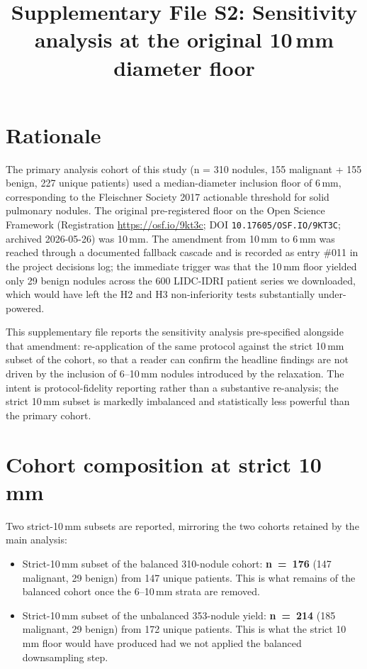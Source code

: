 \documentclass[11pt,a4paper]{article}
\title{\bfseries Supplementary File S2: Sensitivity analysis at the original 10\,mm diameter floor}
\author{}
\date{}
\begin{document}
\maketitle

\section*{Rationale}

The primary analysis cohort of this study (n = 310 nodules, 155 malignant + 155 benign, 227 unique patients) used a median-diameter inclusion floor of 6\,mm, corresponding to the Fleischner Society 2017 actionable threshold for solid pulmonary nodules. The original pre-registered floor on the Open Science Framework (Registration \url{https://osf.io/9kt3c}; DOI \texttt{10.17605/OSF.IO/9KT3C}; archived 2026-05-26) was 10\,mm. The amendment from 10\,mm to 6\,mm was reached through a documented fallback cascade and is recorded as entry \#011 in the project decisions log; the immediate trigger was that the 10\,mm floor yielded only 29 benign nodules across the 600 LIDC-IDRI patient series we downloaded, which would have left the H2 and H3 non-inferiority tests substantially under-powered.

This supplementary file reports the sensitivity analysis pre-specified alongside that amendment: re-application of the same protocol against the strict 10\,mm subset of the cohort, so that a reader can confirm the headline findings are not driven by the inclusion of 6--10\,mm nodules introduced by the relaxation. The intent is protocol-fidelity reporting rather than a substantive re-analysis; the strict 10\,mm subset is markedly imbalanced and statistically less powerful than the primary cohort.

\section*{Cohort composition at strict 10\,mm}

Two strict-10\,mm subsets are reported, mirroring the two cohorts retained by the main analysis:

\begin{itemize}
    \item Strict-10\,mm subset of the balanced 310-nodule cohort: \textbf{n~=~176} (147 malignant, 29 benign) from 147 unique patients. This is what remains of the balanced cohort once the 6--10\,mm strata are removed.
    \item Strict-10\,mm subset of the unbalanced 353-nodule yield: \textbf{n~=~214} (185 malignant, 29 benign) from 172 unique patients. This is what the strict 10\,mm floor would have produced had we not applied the balanced downsampling step.
\end{itemize}
\end{document}
